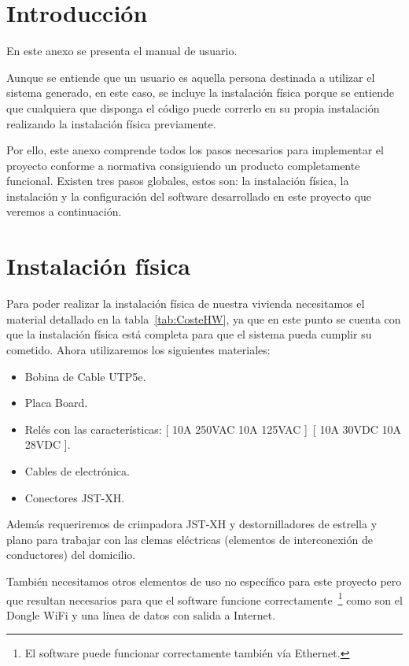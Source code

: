
\section{Introducción}
En este anexo se presenta el manual de usuario.

Aunque se entiende que un usuario es aquella persona destinada a utilizar el sistema generado, en este caso, se incluye la instalación física porque se entiende que cualquiera que disponga el código puede correrlo en su propia instalación realizando la instalación física previamente.

Por ello, este anexo comprende todos los pasos necesarios para implementar el proyecto conforme a normativa consiguiendo un producto completamente funcional. Existen tres pasos globales, estos son: la instalación física, la instalación y la configuración del software desarrollado en este proyecto que veremos a continuación.

\section{Instalación física}
Para poder realizar la instalación física de nuestra vivienda necesitamos el material detallado en la tabla~\ref{tab:CosteHW}, ya que en este punto se cuenta con que la instalación física está completa para que el sistema pueda cumplir su cometido. Ahora utilizaremos los siguientes materiales:
\begin{itemize}
    \item Bobina de Cable UTP5e.
    \item Placa Board.
    \item Relés con las características: [ 10A 250VAC 10A 125VAC ]~[ 10A 30VDC 10A 28VDC ].
    \item Cables de electrónica.
    \item Conectores JST-XH.
\end{itemize}

Además requeriremos de crimpadora JST-XH y destornilladores de estrella y plano para trabajar con las clemas eléctricas (elementos de interconexión de conductores) del domicilio.

También necesitamos otros elementos de uso no específico para este proyecto pero que resultan necesarios para que el software funcione correctamente~\footnote{El software puede funcionar correctamente también vía Ethernet.} como son el Dongle WiFi y una línea de datos con salida a Internet.

